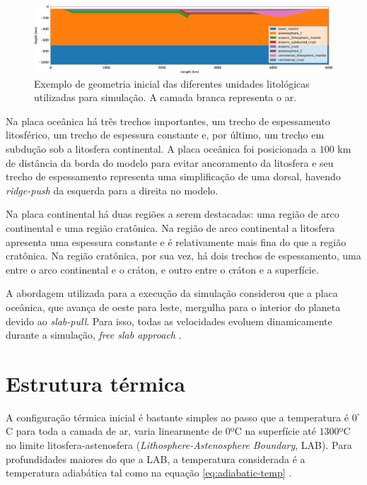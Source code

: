 \begin{figure}
    \centering
    \includegraphics[width=1.0 \textwidth]{fig/geometria-inicial.png}
    \caption{Exemplo de geometria inicial das diferentes unidades litológicas utilizadas para simulação. A camada branca representa o ar.}
    \label{fig:geometria-inicial}
\end{figure}

Na placa oceânica há três trechos importantes, um trecho de espessamento litosférico, um trecho de espessura constante e, por último, um trecho em subdução sob a litosfera continental. A placa oceânica foi posicionada a $100$ km de distância da borda do modelo para evitar ancoramento da litosfera e seu trecho de espessamento representa uma simplificação de uma dorsal, havendo \textit{ridge-push} da esquerda para a direita no modelo.

Na placa continental há duas regiões a serem destacadas: uma região de arco continental e uma região cratônica. Na região de arco continental a litosfera apresenta uma espessura constante e é relativamente mais fina do que a região cratônica. Na região cratônica, por sua vez, há dois trechos de espessamento, uma entre o arco continental e o cráton, e outro entre o cráton e a superfície.

A abordagem utilizada para a execução da simulação considerou que a placa oceânica, que avança de oeste para leste, mergulha para o interior do planeta devido ao \textit{slab-pull}. Para isso, todas as velocidades evoluem dinamicamente durante a simulação, \textit{free slab approach} \citep{assuncao2019}.

\section{Estrutura térmica}

A configuração térmica inicial é bastante simples ao passo que a temperatura é $0^{\circ}$C para toda a camada de ar, varia linearmente de $0$ºC na superfície até $1300$ºC no limite litosfera-astenosfera (\textit{Lithosphere-Astenosphere Boundary}, LAB). Para profundidades maiores do que a LAB, a temperatura considerada é a temperatura adiabática tal como na equação \ref{eq:adiabatic-temp} \citep{turcotte2002geodynamics}.

